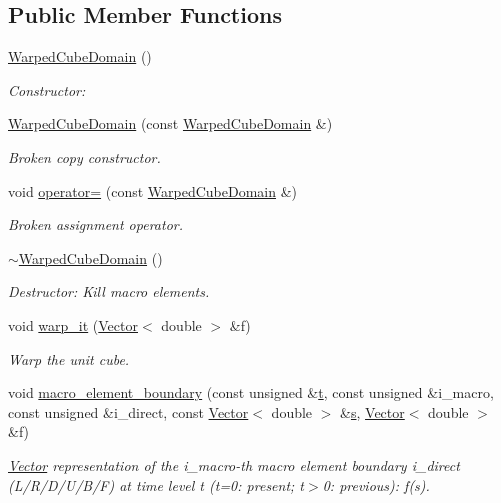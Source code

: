 \subsection*{Public Member Functions}
\begin{DoxyCompactItemize}
\item 
\hyperlink{classoomph_1_1WarpedCubeDomain_af83d4c7153b29b84b4783fe1b47eee2f}{Warped\+Cube\+Domain} ()
\begin{DoxyCompactList}\small\item\em Constructor\+: \end{DoxyCompactList}\item 
\hyperlink{classoomph_1_1WarpedCubeDomain_a4da58a937c4e0579a2c167fbaf3d39c3}{Warped\+Cube\+Domain} (const \hyperlink{classoomph_1_1WarpedCubeDomain}{Warped\+Cube\+Domain} \&)
\begin{DoxyCompactList}\small\item\em Broken copy constructor. \end{DoxyCompactList}\item 
void \hyperlink{classoomph_1_1WarpedCubeDomain_a475e5275c5a93aa96c03509051cede55}{operator=} (const \hyperlink{classoomph_1_1WarpedCubeDomain}{Warped\+Cube\+Domain} \&)
\begin{DoxyCompactList}\small\item\em Broken assignment operator. \end{DoxyCompactList}\item 
\hyperlink{classoomph_1_1WarpedCubeDomain_af8c0702a965e345bbbbf0afbd5ff6ed0}{$\sim$\+Warped\+Cube\+Domain} ()
\begin{DoxyCompactList}\small\item\em Destructor\+: Kill macro elements. \end{DoxyCompactList}\item 
void \hyperlink{classoomph_1_1WarpedCubeDomain_ac84408d0e83979c1516e1f597e8e71e0}{warp\+\_\+it} (\hyperlink{classoomph_1_1Vector}{Vector}$<$ double $>$ \&f)
\begin{DoxyCompactList}\small\item\em Warp the unit cube. \end{DoxyCompactList}\item 
void \hyperlink{classoomph_1_1WarpedCubeDomain_a4e021719488897307d141fe4df327e49}{macro\+\_\+element\+\_\+boundary} (const unsigned \&\hyperlink{cfortran_8h_af6f0bd3dc13317f895c91323c25c2b8f}{t}, const unsigned \&i\+\_\+macro, const unsigned \&i\+\_\+direct, const \hyperlink{classoomph_1_1Vector}{Vector}$<$ double $>$ \&\hyperlink{cfortran_8h_ab7123126e4885ef647dd9c6e3807a21c}{s}, \hyperlink{classoomph_1_1Vector}{Vector}$<$ double $>$ \&f)
\begin{DoxyCompactList}\small\item\em \hyperlink{classoomph_1_1Vector}{Vector} representation of the i\+\_\+macro-\/th macro element boundary i\+\_\+direct (L/\+R/\+D/\+U/\+B/F) at time level t (t=0\+: present; t$>$0\+: previous)\+: f(s). \end{DoxyCompactList}\end{DoxyCompactItemize}
